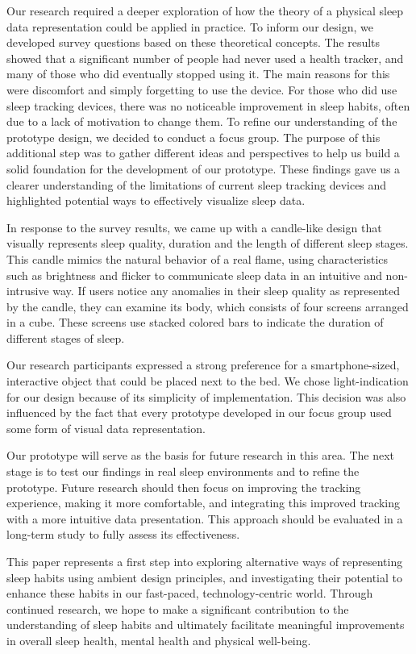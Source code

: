\documentclass[
  a4paper,  %
  twoside,  %
  bibliography=totoc,
  headsepline,
  cleardoublepage=empty,
  parskip=half,
  draft=false
]{scrbook}
\begin{document}
Our research required a deeper exploration of how the theory of a physical sleep data representation could be applied in practice. To inform our design, we developed survey questions based on these theoretical concepts. The results showed that a significant number of people had never used a health tracker, and many of those who did eventually stopped using it. The main reasons for this were discomfort and simply forgetting to use the device. For those who did use sleep tracking devices, there was no noticeable improvement in sleep habits, often due to a lack of motivation to change them. To refine our understanding of the prototype design, we decided to conduct a focus group. The purpose of this additional step was to gather different ideas and perspectives to help us build a solid foundation for the development of our prototype. These findings gave us a clearer understanding of the limitations of current sleep tracking devices and highlighted potential ways to effectively visualize sleep data.

In response to the survey results, we came up with  a candle-like design that visually represents sleep quality, duration and the length of different sleep stages. This candle mimics the natural behavior of a real flame, using characteristics such as brightness and flicker to communicate sleep data in an intuitive and non-intrusive way. If users notice any anomalies in their sleep quality as represented by the candle, they can examine its body, which consists of four screens arranged in a cube. These screens use stacked colored bars to indicate the duration of different stages of sleep.

Our research participants expressed a strong preference for a smartphone-sized, interactive object that could be placed next to the bed. We chose light-indication for our design because of its simplicity of implementation. This decision was also influenced by the fact that every prototype developed in our focus group used some form of visual data representation. 

Our prototype will serve as the basis for future research in this area. The next stage is to test our findings in real sleep environments and to refine the prototype. Future research should then focus on improving the tracking experience, making it more comfortable, and integrating this improved tracking with a more intuitive data presentation. This approach should be evaluated in a long-term study to fully assess its effectiveness.

This paper represents a first step into exploring alternative ways of representing sleep habits using ambient design principles, and investigating their potential to enhance these habits in our fast-paced, technology-centric world. Through continued research, we hope to make a significant contribution to the understanding of sleep habits and ultimately facilitate meaningful improvements in overall sleep health, mental health and physical well-being.
\end{document}
